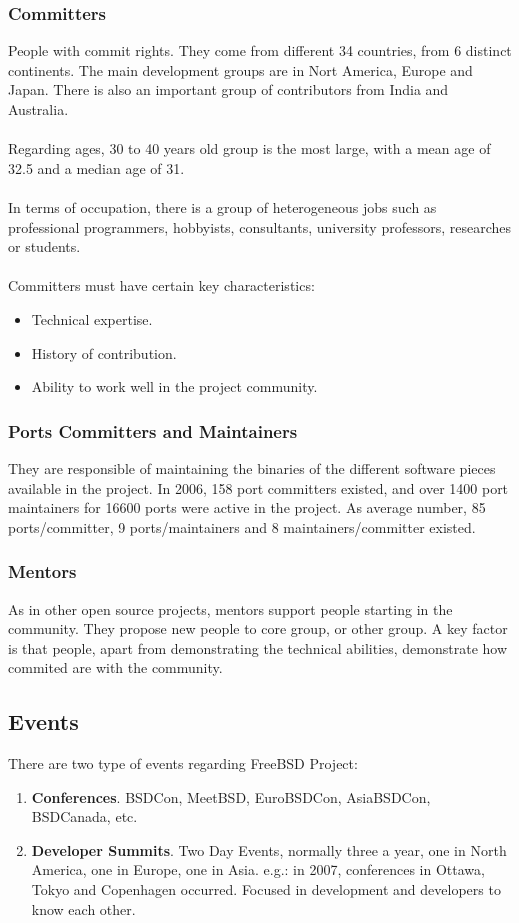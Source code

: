 \documentclass[11pt]{article}
\begin{document}
\subsubsection{Committers} 
People with commit rights. They come from different 34 countries, from 6 distinct continents. The main development groups are in Nort America, Europe and Japan. There is also an important group of contributors from India and Australia.\\
\\
Regarding ages, 30 to 40 years old group is the most large, with a mean age of 32.5 and a median age of 31.\\
\\
In terms of occupation, there is a group of heterogeneous jobs such as professional programmers, hobbyists, consultants, university professors, researches or students.\\
\\
Committers must have certain key characteristics:
\begin{itemize}\itemsep0pt
\item{Technical expertise}.
\item{History of contribution}.
\item{Ability to work well in the project community}.
\end{itemize}
\subsubsection{Ports Committers and Maintainers} 
They are responsible of maintaining the binaries of the different software pieces available in the project.
In 2006, 158 port committers existed, and over 1400 port maintainers for 16600 ports were active in the project. As average number, 85 ports/committer, 9 ports/maintainers and 8 maintainers/committer existed.
\subsubsection{Mentors} 
As in other open source projects, mentors support people starting in the community.
They propose new people to core group, or other group. A key factor is that people, apart from demonstrating the technical abilities, demonstrate how commited are with the community.
\subsection{Events}
There are two type of events regarding FreeBSD Project:
\begin{enumerate}\itemsep0pt
\item{\textbf{Conferences}}. BSDCon, MeetBSD, EuroBSDCon, AsiaBSDCon, BSDCanada, etc.
\item{\textbf{Developer Summits}}. Two Day Events, normally three a year, one in North America, one in Europe, one in Asia. e.g.: in 2007, conferences in Ottawa, Tokyo and Copenhagen occurred. Focused in development and developers to know each other.
\end{enumerate}
\end{document}
